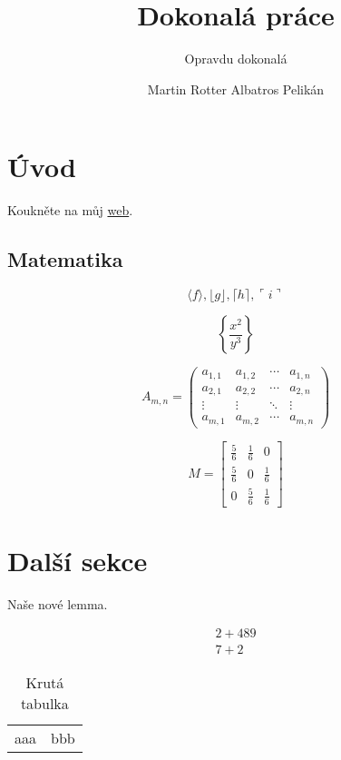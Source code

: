 \documentclass[12pt]{article}
\title{Dokonalá práce}						%
\subtitle{Opravdu dokonalá}
\author{Martin Rotter Albatros Pelikán}
\begin{document}
\maketitle

\section{Úvod}
Koukněte na můj \href{http://www.seznam.cz}{web}.

\subsection{Matematika}
$$\langle f \rangle, \lfloor g \rfloor,
\lceil h \rceil, \ulcorner i \urcorner$$

$$\left\{\frac{x^2}{y^3}\right\}$$

$$
A_{m,n} =
 \begin{pmatrix}
  a_{1,1} & a_{1,2} & \cdots & a_{1,n} \\
  a_{2,1} & a_{2,2} & \cdots & a_{2,n} \\
  \vdots  & \vdots  & \ddots & \vdots  \\
  a_{m,1} & a_{m,2} & \cdots & a_{m,n}
 \end{pmatrix}
$$

$$
M = \begin{bmatrix}
       \frac{5}{6} & \frac{1}{6} & 0           \\[0.3em]
       \frac{5}{6} & 0           & \frac{1}{6} \\[0.3em]
       0           & \frac{5}{6} & \frac{1}{6}
     \end{bmatrix}
$$

\section{Další sekce}

\begin{lemma}
Naše nové lemma.
\end{lemma}

\begin{align}
2+489 \\
7+2
\end{align}


\begin{table}
\begin{tabular}{c | c}
aaa & bbb 
\end{tabular}
\caption{Krutá tabulka}
\end{table}
\end{document}
